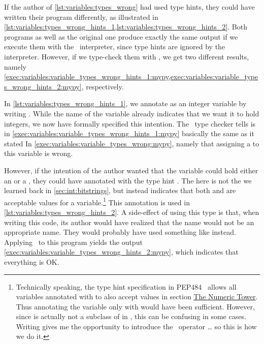 If the author of \cref{lst:variables:types_wrong} had used type hints, they could have written their program differently, as illustrated in \cref{lst:variables:types_wrong_hints_1,lst:variables:types_wrong_hints_2}.
Both programs as well as the original one produce exactly the same output if we execute them with the \python\ interpreter, since type hints are ignored by the interpreter.
However, if we type-check them with \mypy, we get two different results, namely \cref{exec:variables:variable_types_wrong_hints_1:mypy,exec:variables:variable_types_wrong_hints_2:mypy}, respectively.

In \cref{lst:variables:types_wrong_hints_1}, we annotate  as an integer variable by writing .
While the name of the variable already indicates that we want it to hold integers, we now have formally specified this intention.
The \mypy\ type checker tells is in \cref{exec:variables:variable_types_wrong_hints_1:mypy} basically the same as it stated In \cref{exec:variables:variable_types_wrong:mypy}, namely that assigning a  to this variable is wrong.

However, if the intention of the author wanted that the variable could hold either an  or a , they could have annotated with the type hint .
The \pythonil{|} here is not the  we learned back in \cref{sec:int:bitstrings}, but instead indicates that both  and  are acceptable values for a variable.\footnote{%
Technically speaking, the type hint specification in PEP484~\cite{PEP484} allows all variables annotated with  to also accept  values in section \href{https://peps.python.org/pep-0484/\#the-numeric-tower}{The Numeric Tower}. %
Thus annotating the variable only with  would have been sufficient. %
However, since  is actually not a subclass of  in \python, this can be confusing in some cases. %
Writing  gives me the opportunity to introduce the \pythonil{|}~operator {\dots} so this is how we do it.%
}
This annotation is used in \cref{lst:variables:types_wrong_hints_2}.
A side-effect of using this type is that, when writing this code, its author would have realized that the name  would not be an appropriate name.
They would probably have used something like  instead.
Applying \mypy\ to this program yields the output \cref{exec:variables:variable_types_wrong_hints_2:mypy}, which indicates that everything is OK.


